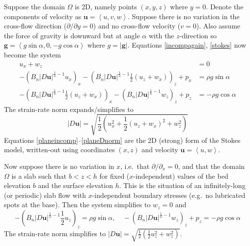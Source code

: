 \documentclass[letterpaper,final,12pt,reqno]{amsart}
\newcommand{\bg}{\mathbf{g}}
\newcommand{\bu}{\mathbf{u}}
\begin{document}
Suppose the domain $\Omega$ is 2D, namely points $(x,y,z)$ where $y=0$.  Denote the components of velocity as $\bu=\left<u,v,w\right>$.  Suppose there is no variation in the cross-flow direction ($\partial/\partial y=0$) and no cross-flow velocity ($v=0$).  Also assume the force of gravity is downward but at angle $\alpha$ with the $z$-direction so $\bg = \left<g\sin\alpha,0,-g\cos\alpha\right>$ where $g=|\bg|$.  Equations \eqref{incompagain}, \eqref{stokes} now become the system
\begin{align}
u_x + w_z &= 0 \label{planeincomp} \\
- \left(B_n |D\bu|^{\frac{1}{n}-1} u_x\right)_x - \left(B_n |D\bu|^{\frac{1}{n}-1} \frac{1}{2} \left(u_z+w_x\right)\right)_z + p_x &= \rho g\sin\alpha \label{planestressx} \\
- \left(B_n |D\bu|^{\frac{1}{n}-1} \frac{1}{2} \left(u_z+w_x\right)\right)_x - \left(B_n |D\bu|^{\frac{1}{n}-1} w_z\right)_z + p_z &= -\rho g\cos\alpha \label{planestressz}
\end{align}
The strain-rate norm expands/simplifies to
\begin{equation}
    |D\bu| = \sqrt{\frac{1}{2} \left(u_x^2 + \frac{1}{2}(u_z+w_x)^2 + w_z^2\right)}  \label{planeDnorm}
\end{equation}
Equations \eqref{planeincomp}--\eqref{planeDnorm} are the 2D (strong) form of the Stokes model, written-out using coordinates $(x,z)$ and velocity $\bu=\left<u,w\right>$.

Now suppose there is no variation in $x$, i.e.~that $\partial/\partial_x=0$, and that the domain $\Omega$ is a slab such that $b < z < h$ for fixed ($x$-independent) values of the bed elevation $b$ and the surface elevation $h$.  This is the situation of an infinitely-long (or periodic) slab flow with $x$-independent boundary stresses (e.g.~no lubricated spots at the base).  Then the system simplifies to $w_z=0$ and
\begin{equation}
- \left(B_n |D\bu|^{\frac{1}{n}-1} \frac{1}{2} u_z\right)_z = \rho g\sin\alpha, \quad
- \left(B_n |D\bu|^{\frac{1}{n}-1} w_z\right)_z + p_z = -\rho g\cos\alpha \label{slabstresses}
\end{equation}
The strain-rate norm simplifies to $|D\bu| = \sqrt{\frac{1}{2} \left(\frac{1}{2}u_z^2 + w_z^2\right)}$.
\end{document}

